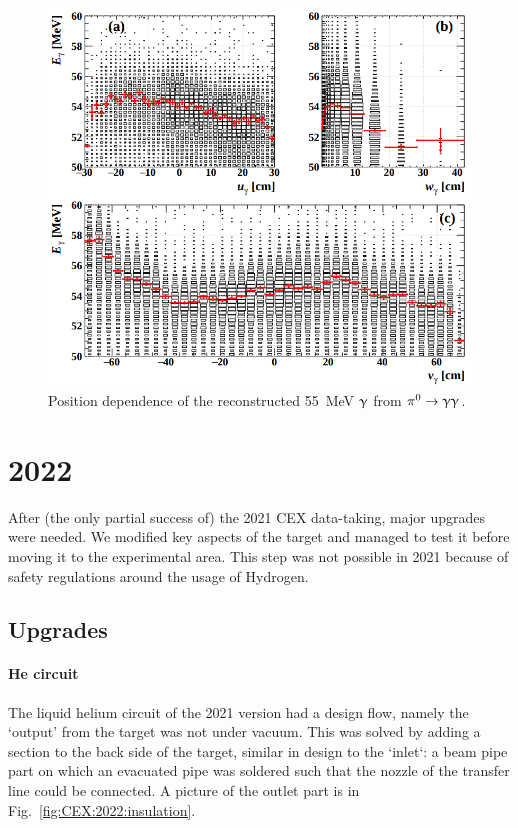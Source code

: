 \begin{refsection}
        \begin{figure}
            \centering
            \includegraphics[width=0.9\linewidth]{Figures/LH2/2021/CEX2021_position-dependence.png}
            \caption{Position dependence of the reconstructed \SI{55}{MeV} $\upgamma$ from $\pi^0\rightarrow\upgamma\upgamma$.}
            \label{fig:CEX2021:nonuniformity}
        \end{figure}
\section{2022}
    After (the only partial success of) the 2021 CEX data-taking, major upgrades were needed.
    We modified key aspects of the target and managed to test it before moving it to the experimental area.
    This step was not possible in 2021 because of safety regulations around the usage of Hydrogen.

    \subsection{Upgrades}
        \paragraph{He circuit} The liquid helium circuit of the 2021 version had a  design flow, namely the `output' from the target was not under vacuum.
        This was solved by adding a section to the back side of the target, similar in design to the `inlet`: a beam pipe part on which an evacuated pipe was soldered such that the nozzle of the transfer line could be connected.
        A picture of the outlet part is in Fig.~\ref{fig:CEX:2022:insulation}.
        

\end{refsection}

